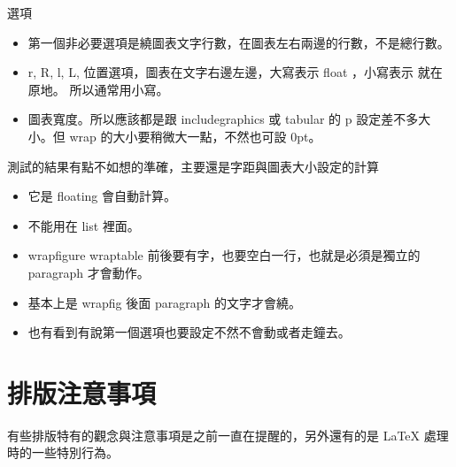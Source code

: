 選項
\begin{itemize}
  \item 第一個非必要選項是繞圖表文字行數，在圖表左右兩邊的行數，不是總行數。
  \item r, R, l, L,  位置選項，圖表在文字右邊左邊，大寫表示 float ，小寫表示
    就在原地。 所以通常用小寫。
  \item 圖表寬度。所以應該都是跟 includegraphics 或 tabular 的 p 設定差不多大
    小。但 wrap 的大小要稍微大一點，不然也可設 0pt。
\end{itemize}
測試的結果有點不如想的準確，主要還是字距與圖表大小設定的計算
\begin{itemize}
  \item 它是 floating 會自動計算。
  \item 不能用在 list 裡面。
  \item wrapfigure wraptable 前後要有字，也要空白一行，也就是必須是獨立的
    paragraph 才會動作。
  \item 基本上是 wrapfig 後面 paragraph 的文字才會繞。
  \item 也有看到有說第一個選項也要設定不然不會動或者走鐘去。
\end{itemize}

\section{排版注意事項}
有些排版特有的觀念與注意事項是之前一直在提醒的，另外還有的是 {\LaTeX} 處理
時的一些特別行為。

